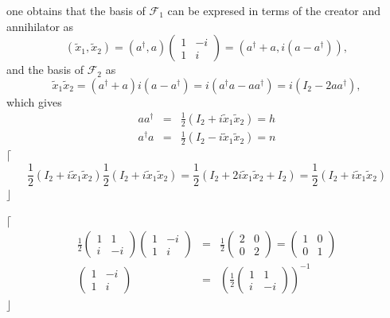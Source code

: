 \documentclass[aps,preprint]{revtex4}
\begin{document}
one obtains that the basis of $\mathcal{F}_{1}$ can be expresed in terms of
the creator and annihilator as 
\begin{equation}
\left( \widetilde{x}_{1},\widetilde{x}_{2}\right) =\left( a^{\dagger
},a\right) \left( 
\begin{array}{cc}
1 & -i \\ 
1 & i%
\end{array}%
\right) =\left( a^{\dagger }+a,i\left( a-a^{\dagger }\right) \right) ,
\end{equation}%
and the basis of $\mathcal{F}_{2}$ as 
\begin{equation}
\widetilde{x}_{1}\widetilde{x}_{2}=\left( a^{\dagger }+a\right) i\left(
a-a^{\dagger }\right) =i\left( a^{\dagger }a-aa^{\dagger }\right) =i\left(
I_{2}-2aa^{\dagger }\right) ,
\end{equation}%
which gives 
\begin{eqnarray}
aa^{\dagger } &=&\frac{1}{2}\left( I_{2}+i\widetilde{x}_{1}\widetilde{x}%
_{2}\right) =h \\
a^{\dagger }a &=&\frac{1}{2}\left( I_{2}-i\widetilde{x}_{1}\widetilde{x}%
_{2}\right) =n
\end{eqnarray}%
$\lceil $%
\begin{equation}
\frac{1}{2}\left( I_{2}+i\widetilde{x}_{1}\widetilde{x}_{2}\right) \frac{1}{2%
}\left( I_{2}+i\widetilde{x}_{1}\widetilde{x}_{2}\right) =\frac{1}{2}\left(
I_{2}+2i\widetilde{x}_{1}\widetilde{x}_{2}+I_{2}\right) =\frac{1}{2}\left(
I_{2}+i\widetilde{x}_{1}\widetilde{x}_{2}\right)
\end{equation}%
$\rfloor $

$\lceil $%
\begin{eqnarray}
\frac{1}{2}\left( 
\begin{array}{cc}
1 & 1 \\ 
i & -i%
\end{array}%
\right) \left( 
\begin{array}{cc}
1 & -i \\ 
1 & i%
\end{array}%
\right) &=&\frac{1}{2}\left( 
\begin{array}{cc}
2 & 0 \\ 
0 & 2%
\end{array}%
\right) =\left( 
\begin{array}{cc}
1 & 0 \\ 
0 & 1%
\end{array}%
\right) \\
\left( 
\begin{array}{cc}
1 & -i \\ 
1 & i%
\end{array}%
\right) &=&\left( \frac{1}{2}\left( 
\begin{array}{cc}
1 & 1 \\ 
i & -i%
\end{array}%
\right) \right) ^{-1}
\end{eqnarray}%
$\rfloor $
\end{document}
